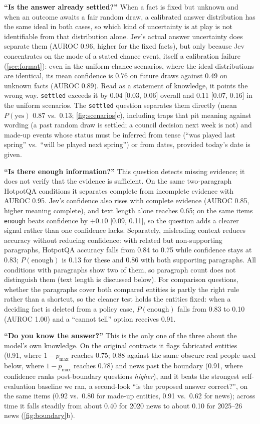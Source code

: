 \documentclass[10pt,twocolumn]{article}
\newcommand{\pmax}{p_{\max}}
\begin{document}
\textbf{``Is the answer already settled?''} When a fact is fixed but unknown
and when an outcome awaits a fair random draw, a calibrated answer
distribution has the same ideal in both cases, so which kind of uncertainty is
at play is not identifiable from that distribution alone. Jev's actual
answer uncertainty does separate them (AUROC 0.96, higher for the fixed
facts), but only because Jev concentrates on the mode of a stated chance event,
itself a calibration failure (\cref{sec:format}): even in the uniform-chance
scenarios, where the ideal distributions are identical, its mean confidence is
0.76 on future draws against 0.49 on unknown facts (AUROC 0.89). Read as a
statement of knowledge, it points the wrong way. \texttt{settled} exceeds it by
0.04 [0.03, 0.06] overall and 0.11 [0.07, 0.16] in the uniform scenarios. The \texttt{settled} question separates them directly (mean $P(\text{yes})$ 0.87 vs.\ 0.13;
\cref{fig:scenarios}c), including traps that pit meaning against wording (a
past random draw is settled; a council decision next week is not) and made-up
events whose status must be inferred from tense (``was played last spring'' vs.\
``will be played next spring'') or from dates, provided today's date is given.

\textbf{``Is there enough information?''} This question detects missing
evidence; it does not verify that the evidence is sufficient. On the same
two-paragraph HotpotQA conditions it
separates complete from incomplete evidence with AUROC 0.95. Jev's confidence
also rises with complete evidence (AUROC 0.85, higher meaning complete), and
text length alone reaches 0.65; on the same items \texttt{enough} beats
confidence by $+0.10$ [0.09, 0.11], so the question adds a clearer signal
rather than one confidence lacks. Separately, misleading
context reduces accuracy without reducing confidence: with related but non-supporting
paragraphs, HotpotQA accuracy falls from 0.84 to 0.75 while confidence stays at
0.83; $P(\text{enough})$ is 0.13 for these and 0.86 with both supporting
paragraphs. All conditions with paragraphs show two of them, so paragraph
count does not distinguish them (text length is discussed below). For
comparison questions, whether the paragraphs cover both compared entities is
partly the right rule rather than a shortcut, so the cleaner test holds the
entities fixed: when a deciding fact is deleted from a policy case, $P(\text{enough})$
falls from 0.83 to 0.10 (AUROC 1.00) and a ``cannot tell'' option receives 0.91.

\textbf{``Do you know the answer?''} This is the only one of the three about
the model's own knowledge. On the original contrasts it flags fabricated
entities (0.91, where $1-\pmax$ reaches 0.75; 0.88 against the same obscure
real people used below, where $1-\pmax$ reaches 0.78) and news past the boundary
(0.91, where confidence ranks post-boundary questions \emph{higher}), and it
beats the strongest self-evaluation baseline we ran, a second-look ``is the
proposed answer correct?'', on the same items (0.92 vs.\ 0.80 for made-up
entities, 0.91 vs.\ 0.62 for news); across time it falls
steadily from about 0.40 for 2020 news to about 0.10 for 2025--26 news
(\cref{fig:boundary}b).
\end{document}
